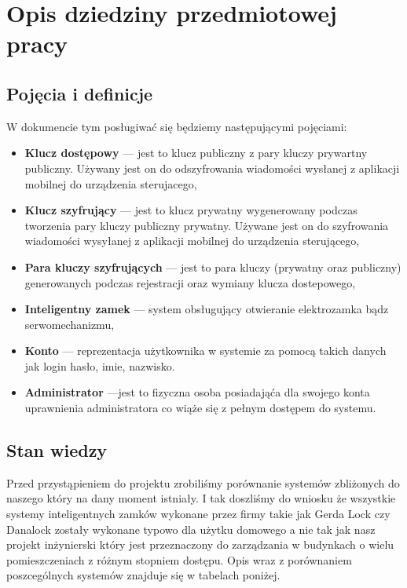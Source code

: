 % 
\newpage\section{Opis dziedziny przedmiotowej pracy}\label{sec:dziedzina}
\subsection{Pojęcia i definicje}
W dokumencie tym posługiwać się będziemy następującymi pojęciami:


	\begin{itemize}
	\item \textbf{Klucz dostępowy} --- jest to klucz publiczny z pary kluczy prywartny publiczny. Używany jest on do odszyfrowania wiadomości wysłanej z aplikacji mobilnej do urządzenia sterujacego,
	
	\item \textbf{Klucz szyfrujący} 
	--- jest to klucz prywatny wygenerowany podczas tworzenia pary kluczy publiczny prywatny. Używane jest on do szyfrowania wiadomości wysyłanej z aplikacji mobilnej do urządzenia sterującego,
	
    \item \textbf{Para kluczy szyfrujących}
    --- jest to para kluczy (prywatny oraz publiczny) generowanych podczas rejestracji oraz wymiany klucza dostepowego,
	
	\item \textbf{Inteligentny zamek}
	--- system obsługujący otwieranie elektrozamka bądz serwomechanizmu,
    \item \textbf{Konto}
	--- reprezentacja użytkownika w systemie za pomocą takich danych jak login hasło, imie, nazwisko.
	\item \textbf{Administrator}
	---jest to fizyczna osoba posiadająća dla swojego konta uprawnienia administratora co wiąże się z pełnym dostępem do systemu.					
\end{itemize}



\newpage
\subsection{Stan wiedzy}
Przed przystąpieniem do projektu zrobiliśmy porównanie systemów zbliżonych do naszego który na dany moment istniały. I tak doszliśmy do wniosku że wszystkie systemy inteligentnych zamków wykonane przez firmy takie jak Gerda Lock czy Danalock zostały wykonane typowo dla użytku domowego a nie tak jak nasz projekt inżynierski który jest przeznaczony do zarządzania w budynkach o wielu pomieszczeniach z różnym stopniem dostępu. Opis wraz z porównaniem poszcególnych systemów znajduje się w tabelach poniżej.


